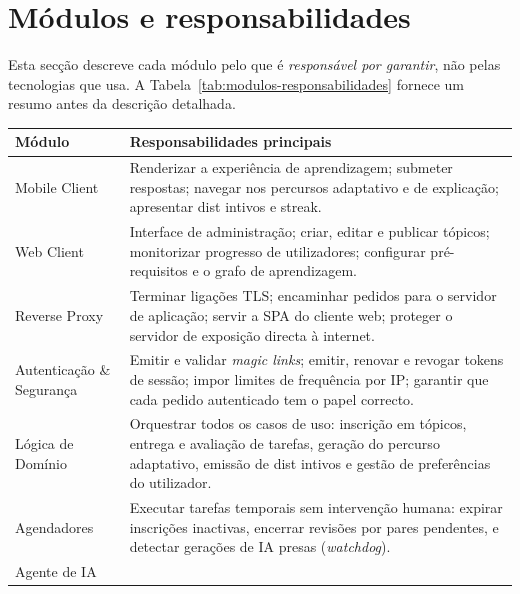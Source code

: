 \section{M\'odulos e responsabilidades}
\label{sec:modulos}

Esta sec\c{c}\~ao descreve cada m\'odulo pelo que \'e \emph{respons\'avel por
garantir}, n\~ao pelas tecnologias que usa. A Tabela~\ref{tab:modulos-responsabilidades}
fornece um resumo antes da descri\c{c}\~ao detalhada.

\begin{table}[htbp]
	\centering
	\small
	\begin{tabular}{p{3.0cm} p{9.5cm}}
		\toprule
		\textbf{M\'odulo} & \textbf{Responsabilidades principais} \\
		\midrule
		Mobile Client
			& Renderizar a experi\^encia de aprendizagem; submeter respostas; navegar
			  nos percursos adaptativo e de explica\c{c}\~ao; apresentar dist intivos e streak. \\
		\addlinespace
		Web Client
			& Interface de administra\c{c}\~ao; criar, editar e publicar t\'opicos; monitorizar
			  progresso de utilizadores; configurar pr\'e-requisitos e o grafo de
			  aprendizagem. \\
		\addlinespace
		Reverse Proxy
			& Terminar liga\c{c}\~oes TLS; encaminhar pedidos para o servidor de aplica\c{c}\~ao;
			  servir a SPA do cliente web; proteger o servidor de exposi\c{c}\~ao directa
			  \`a internet. \\
		\addlinespace
		Autentica\c{c}\~ao \& Seguran\c{c}a
			& Emitir e validar \emph{magic links}; emitir, renovar e revogar tokens
			  de sess\~ao; impor limites de frequ\^encia por IP; garantir que cada pedido
			  autenticado tem o papel correcto. \\
		\addlinespace
		L\'ogica de Dom\'inio
			& Orquestrar todos os casos de uso: inscri\c{c}\~ao em t\'opicos,
			  entrega e avalia\c{c}\~ao de tarefas, gera\c{c}\~ao do percurso adaptativo,
			  emiss\~ao de dist intivos e gest\~ao de prefer\^encias do utilizador. \\
		\addlinespace
		Agendadores
			& Executar tarefas temporais sem interven\c{c}\~ao humana: expirar inscri\c{c}\~oes
			  inactivas, encerrar revis\~oes por pares pendentes, e detectar gera\c{c}\~oes
			  de IA presas (\emph{watchdog}). \\
		\addlinespace
		Agente de IA

\end{tabular}
\end{table}
